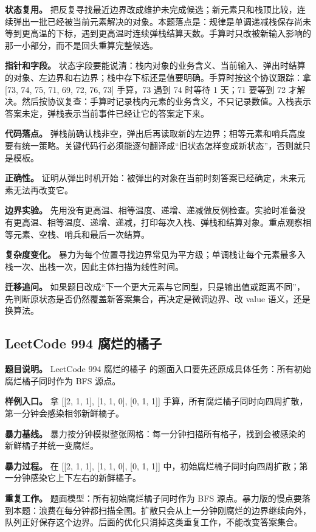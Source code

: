 \textbf{状态复用。} 把反复寻找最近边界改成维护未完成候选；新元素只和栈顶比较，连续弹出一批已经被当前元素解决的对象。本题落点是：规律是单调递减栈保存尚未等到更高温的下标，遇到更高温时连续弹栈结算天数。手算时只改被新输入影响的那一小部分，而不是回头重算完整候选。

\textbf{指针和字段。} 状态字段要能说清：栈内对象的业务含义、当前输入、弹出时结算的对象、左边界和右边界；栈中存下标还是值要明确。手算时按这个协议跟踪：拿 [73, 74, 75, 71, 69, 72, 76, 73] 手算，73 遇到 74 时等待 1 天；71 要等到 72 才解决。然后按协议复查：手算时记录栈内元素的业务含义，不只记录数值。入栈表示答案未定，弹栈表示当前事件已经让它的答案定下来。

\textbf{代码落点。} 弹栈前确认栈非空，弹出后再读取新的左边界；相等元素和哨兵高度要有统一策略。关键代码行必须能逐句翻译成“旧状态怎样变成新状态”，否则就只是模板。

\textbf{正确性。} 证明从弹出时机开始：被弹出的对象在当前时刻答案已经确定，未来元素无法再改变它。

\textbf{边界实验。} 先用没有更高温、相等温度、递增、递减做反例检查。实验时准备没有更高温、相等温度、递增、递减，打印每次入栈、弹栈和结算对象。重点观察相等元素、空栈、哨兵和最后一次结算。

\textbf{复杂度变化。} 暴力为每个位置寻找边界常见为平方级；单调栈让每个元素最多入栈一次、出栈一次，因此主体扫描为线性时间。

\textbf{迁移追问。} 如果题目改成“下一个更大元素与它同型，只是输出值或距离不同”，先判断原状态是否仍然覆盖新答案集合，再决定是微调边界、改 value 语义，还是换算法。

\subsection{LeetCode 994 腐烂的橘子}

\textbf{题目说明。} LeetCode 994 腐烂的橘子 的题面入口要先还原成具体任务：所有初始腐烂橘子同时作为 BFS 源点。

\textbf{样例入口。} 拿 [[2, 1, 1], [1, 1, 0], [0, 1, 1]] 手算，所有腐烂橘子同时向四周扩散，第一分钟会感染相邻新鲜橘子。

\textbf{暴力基线。} 暴力按分钟模拟整张网格：每一分钟扫描所有格子，找到会被感染的新鲜橘子并统一变腐烂。

\textbf{暴力过程。} 在 [[2, 1, 1], [1, 1, 0], [0, 1, 1]] 中，初始腐烂橘子同时向四周扩散；第一分钟感染它上下左右的新鲜橘子。

\textbf{重复工作。} 题面模型：所有初始腐烂橘子同时作为 BFS 源点。暴力版的慢点要落到本题：浪费在每分钟都扫描全图。扩散只会从上一分钟刚腐烂的边界继续向外，队列正好保存这个边界。后面的优化只消掉这类重复工作，不能改变答案集合。

